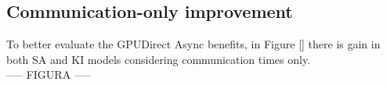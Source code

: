 \documentclass[review]{siamart1116}
\begin{document}
\subsection{Communication-only improvement}\label{sec:comm_only}

To better evaluate the GPUDirect Async benefits, in Figure \ref{} there is gain in both SA and KI models considering communication times only.\\

----- FIGURA -----\\


%
%



%
%
\end{document}
